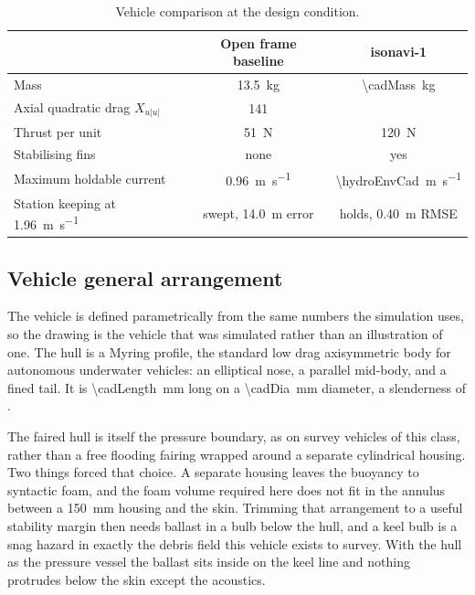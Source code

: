 \documentclass[10pt,a4paper]{article}
\begin{document}
\begin{table}[htbp]\centering\small
\caption{Vehicle comparison at the design condition.}
\begin{tabular}{lcc}
\toprule
& \textbf{Open frame baseline} & \textbf{isonavi-1} \\
\midrule
Mass & \SI{13.5}{\kilogram} & \SI{\cadMass}{\kilogram} \\
Axial quadratic drag $X_{u|u|}$ & 141 & \hydroDragTotal{} \\
Thrust per unit & \SI{51}{\newton} & \SI{120}{\newton} \\
Stabilising fins & none & yes \\
Maximum holdable current & \SI{0.96}{\metre\per\second} & \SI{\hydroEnvCad}{\metre\per\second} \\
Station keeping at \SI{1.96}{\metre\per\second} & swept, \SI{14.0}{\metre} error & holds, \SI{0.40}{\metre} RMSE \\
\bottomrule
\end{tabular}
\end{table}


\subsection{Vehicle general arrangement}

The vehicle is defined parametrically from the same numbers the simulation
uses, so the drawing is the vehicle that was simulated rather than an
illustration of one. The hull is a Myring profile, the standard low drag
axisymmetric body for autonomous underwater vehicles: an elliptical nose, a
parallel mid-body, and a fined tail. It is \SI{\cadLength}{\milli\metre} long
on a \SI{\cadDia}{\milli\metre} diameter, a slenderness of \cadSlender{}.

The faired hull is itself the pressure boundary, as on survey vehicles of this
class, rather than a free flooding fairing wrapped around a separate
cylindrical housing. Two things forced that choice. A separate housing leaves
the buoyancy to syntactic foam, and the foam volume required here does not fit
in the annulus between a \SI{150}{\milli\metre} housing and the skin. Trimming
that arrangement to a useful stability margin then needs ballast in a bulb
below the hull, and a keel bulb is a snag hazard in exactly the debris field
this vehicle exists to survey. With the hull as the pressure vessel the ballast
sits inside on the keel line and nothing protrudes below the skin except the
acoustics.
\end{document}
